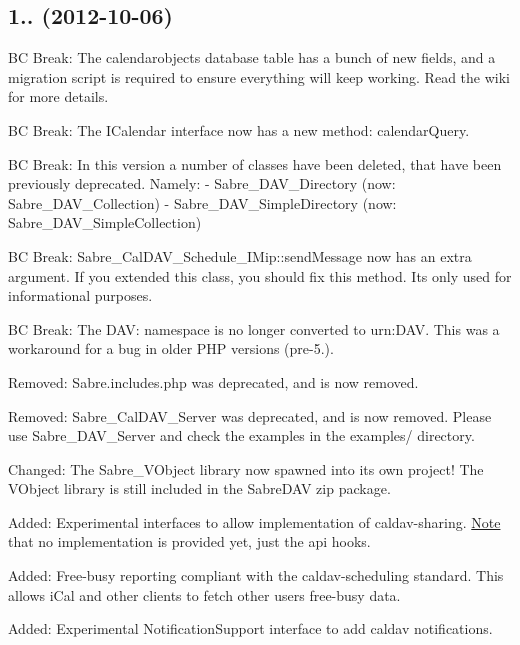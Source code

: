 \subsection*{1.. (2012-\/10-\/06) }


\begin{DoxyItemize}
\item BC Break\+: The calendarobjects database table has a bunch of new fields, and a migration script is required to ensure everything will keep working. Read the wiki for more details.
\item BC Break\+: The I\+Calendar interface now has a new method\+: calendar\+Query.
\item BC Break\+: In this version a number of classes have been deleted, that have been previously deprecated. Namely\+: -\/ Sabre\+\_\+\+D\+A\+V\+\_\+\+Directory (now\+: Sabre\+\_\+\+D\+A\+V\+\_\+\+Collection) -\/ Sabre\+\_\+\+D\+A\+V\+\_\+\+Simple\+Directory (now\+: Sabre\+\_\+\+D\+A\+V\+\_\+\+Simple\+Collection)
\item BC Break\+: Sabre\+\_\+\+Cal\+D\+A\+V\+\_\+\+Schedule\+\_\+\+I\+Mip\+::send\+Message now has an extra argument. If you extended this class, you should fix this method. It\textquotesingle{}s only used for informational purposes.
\item BC Break\+: The D\+AV\+: namespace is no longer converted to urn\+:D\+AV. This was a workaround for a bug in older P\+HP versions (pre-\/5.).
\item Removed\+: Sabre.\+includes.\+php was deprecated, and is now removed.
\item Removed\+: Sabre\+\_\+\+Cal\+D\+A\+V\+\_\+\+Server was deprecated, and is now removed. Please use Sabre\+\_\+\+D\+A\+V\+\_\+\+Server and check the examples in the examples/ directory.
\item Changed\+: The Sabre\+\_\+\+V\+Object library now spawned into it\textquotesingle{}s own project! The V\+Object library is still included in the Sabre\+D\+AV zip package.
\item Added\+: Experimental interfaces to allow implementation of caldav-\/sharing. \mbox{\hyperlink{class_note}{Note}} that no implementation is provided yet, just the api hooks.
\item Added\+: Free-\/busy reporting compliant with the caldav-\/scheduling standard. This allows i\+Cal and other clients to fetch other users\textquotesingle{} free-\/busy data.
\item Added\+: Experimental Notification\+Support interface to add caldav notifications.

\end{DoxyItemize}
